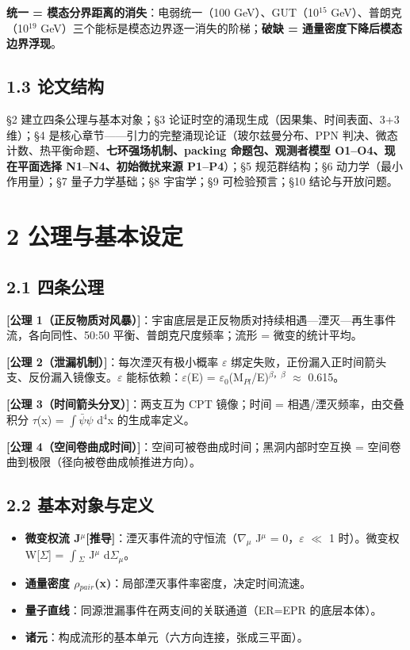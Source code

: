 \documentclass[12pt]{article}
\newcommand{\mtag}[1]{\textbf{[#1]}}
\newcommand{\up}[1]{\ensuremath{^{#1}}}
\newcommand{\down}[1]{\ensuremath{_{#1}}}
\begin{document}
\textbf{统一 = 模态分界距离的消失}：电弱统一（100 GeV）、GUT（10\up{15} GeV）、普朗克（10\up{19} GeV）三个能标是模态边界逐一消失的阶梯；\textbf{破缺 = 通量密度下降后模态边界浮现}。

\subsection{1.3 论文结构}

\S{}2 建立四条公理与基本对象；\S{}3 论证时空的涌现生成（因果集、时间表面、3+3 维）；\S{}4 是核心章节------引力的完整涌现论证（玻尔兹曼分布、PPN 判决、微态计数、热平衡命题、\textbf{七环强场机制、packing 命题包、观测者模型 O1--O4、现在平面选择 N1--N4、初始微扰来源 P1--P4}）；\S{}5 规范群结构；\S{}6 动力学（最小作用量）；\S{}7 量子力学基础；\S{}8 宇宙学；\S{}9 可检验预言；\S{}10 结论与开放问题。



\section{2 公理与基本设定}

\subsection{2.1 四条公理}

\textbf{\mtag{公理 1（正反物质对风暴）}}：宇宙底层是正反物质对持续相遇---湮灭---再生事件流，各向同性、50:50 平衡、普朗克尺度频率；流形 = 微变的统计平均。

\textbf{\mtag{公理 2（泄漏机制）}}：每次湮灭有极小概率 \ensuremath{\varepsilon} 绑定失败，正份漏入正时间箭头支、反份漏入镜像支。\ensuremath{\varepsilon} 能标依赖：\ensuremath{\varepsilon}(E) = \ensuremath{\varepsilon}\down{0}(M\down{Pl}/E)\up{\beta{}，\beta{}} \ensuremath{\approx} 0.615。

\textbf{\mtag{公理 3（时间箭头分叉）}}：两支互为 CPT 镜像；时间 = 相遇/湮灭频率，由交叠积分 \ensuremath{\tau}(x) = \ensuremath{\int}\ensuremath{\bar{\psi}}\ensuremath{\psi} d\up{4}x 的生成率定义。

\textbf{\mtag{公理 4（空间卷曲成时间）}}：空间可被卷曲成时间；黑洞内部时空互换 = 空间卷曲到极限（径向被卷曲成帧推进方向）。

\subsection{2.2 基本对象与定义}

\begin{itemize}
\item \textbf{微变权流 J\up{\mu{}}}\mtag{推导}：湮灭事件流的守恒流（\ensuremath{\nabla}\down{\mu{}} J\up{\mu{}} = 0，\ensuremath{\varepsilon} \ensuremath{\ll} 1 时）。微变权 W[\ensuremath{\Sigma}] = \ensuremath{\int}\down{\Sigma{}} J\up{\mu{}} d\ensuremath{\Sigma}\down{\mu{}}。
\item \textbf{通量密度 \ensuremath{\rho}\down{pair}(x)}：局部湮灭事件率密度，决定时间流速。
\item \textbf{量子直线}：同源泄漏事件在两支间的关联通道（ER=EPR 的底层本体）。
\item \textbf{诸元}：构成流形的基本单元（六方向连接，张成三平面）。
\end{itemize}
\end{document}
